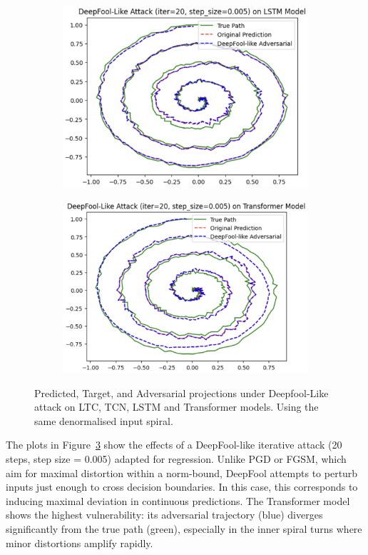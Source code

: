 \begin{figure}[H]
\begin{subfigure}[b]{0.45\linewidth}
        \includegraphics[width=\linewidth]{img/deepfool_spiral_lstm.png}
        \label{fig:deepfool_spiral_lstm}
    \end{subfigure}
    \hfill
    \begin{subfigure}[b]{0.45\linewidth}
        \includegraphics[width=\linewidth]{img/deepfool_spiral_transformer.png}
        \label{fig:deepfool_spiral_transformer}
    \end{subfigure}
    \caption{Predicted, Target, and Adversarial projections under Deepfool-Like attack on LTC, TCN, LSTM and Transformer models. Using the same denormalised input spiral.}
    \label{fig:deepfool_spirals}
\end{figure}

The plots in Figure~\ref{fig:deepfool_spirals} show the effects of a DeepFool-like iterative attack (20 steps, step size = 0.005) adapted for regression. Unlike PGD or FGSM, which aim for maximal distortion within a norm-bound, DeepFool attempts to perturb inputs just enough to cross decision boundaries. In this case, this corresponds to inducing maximal deviation in continuous predictions. The Transformer model shows the highest vulnerability: its adversarial trajectory (blue) diverges significantly from the true path (green), especially in the inner spiral turns where minor distortions amplify rapidly.

